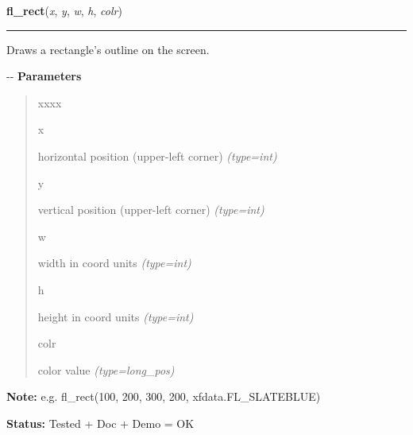     \label{xformslib:flxbasic:fl_rect}

    \vspace{0.5ex}

\hspace{.8\funcindent}\begin{boxedminipage}{\funcwidth}

    \raggedright \textbf{fl\_rect}(\textit{x}, \textit{y}, \textit{w}, \textit{h}, \textit{colr})

    \vspace{-1.5ex}

    \rule{\textwidth}{0.5\fboxrule}
\setlength{\parskip}{2ex}

Draws a rectangle's outline on the screen.

-{}-
\setlength{\parskip}{1ex}
      \textbf{Parameters}
      \vspace{-1ex}

      \begin{quote}
        \begin{Ventry}{xxxx}

          \item[x]


horizontal position (upper-left corner)
            {\it (type=int)}

          \item[y]


vertical position (upper-left corner)
            {\it (type=int)}

          \item[w]


width in coord units
            {\it (type=int)}

          \item[h]


height in coord units
            {\it (type=int)}

          \item[colr]


color value
            {\it (type=long\_pos)}

        \end{Ventry}

      \end{quote}

\textbf{Note:} 
e.g. fl\_rect(100, 200, 300, 200, xfdata.FL\_SLATEBLUE)


\textbf{Status:} 
Tested + Doc + Demo = OK


    \end{boxedminipage}

